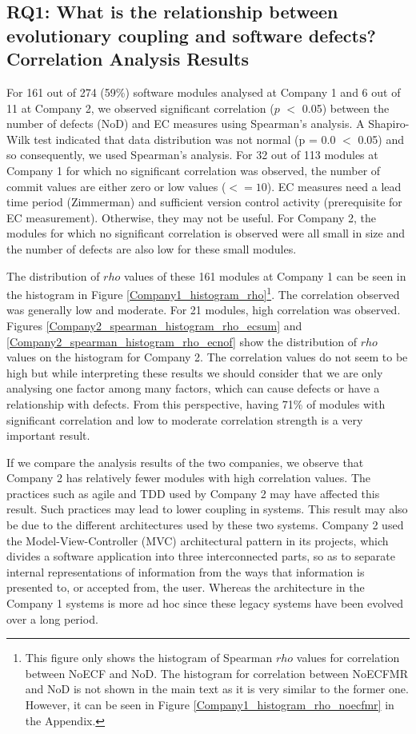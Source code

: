 \documentclass[times]{smrauth}
\begin{document}
\subsection{RQ1: What is the relationship between evolutionary coupling and software defects? Correlation Analysis Results}

For 161 out of 274 (59\%) software modules analysed at Company 1 and 6 out of 11 at Company 2, we observed significant correlation ($p$ $<$ 0.05) between the number of defects (NoD) and EC measures using Spearman's analysis. A Shapiro-Wilk test indicated that data distribution was not normal (p = 0.0 $<$ 0.05) and so consequently, we used Spearman's analysis. For 32 out of 113 modules at Company 1 for which no significant correlation was observed, the number of commit values are either zero or low values ($<=10$). EC measures need a lead time period (Zimmerman) and sufficient version control activity (prerequisite for EC measurement). Otherwise, they may not be useful. For Company 2, the modules for which no significant correlation is observed were all small in size and the number of defects are also low for these small modules.


The distribution of $rho$ values of these 161 modules at Company 1 can be seen in the histogram in Figure \ref{Company1_histogram_rho}\footnote{This figure only shows the histogram of Spearman $rho$ values for correlation between NoECF and NoD. The histogram for correlation between NoECFMR and NoD is not shown in the main text as it is very similar to the former one. However, it can be seen in Figure \ref{Company1_histogram_rho_noecfmr} in the Appendix.}. The correlation observed was generally low and moderate. For 21 modules, high correlation was observed. Figures \ref{Company2_spearman_histogram_rho_ecsum} and \ref{Company2_spearman_histogram_rho_ecnof} show the distribution of $rho$ values on the histogram for Company 2. The correlation values do not seem to be high but while interpreting these results we should consider that we are only analysing one factor among many factors, which can cause defects or have a relationship with defects. From this perspective, having 71\% of modules with significant correlation and low to moderate correlation strength is a very important result.



If we compare the analysis results of the two companies, we observe that Company 2 has relatively fewer modules with high correlation values. The practices such as agile and TDD used by Company 2 may have affected this result. Such practices may lead to lower coupling in systems. This result may also be due to the different architectures used by these two systems. Company 2 used the Model-View-Controller (MVC) architectural pattern in its projects, which divides a software application into three interconnected parts, so as to separate internal representations of information from the ways that information is presented to, or accepted from, the user. Whereas the architecture in the Company 1 systems is more ad hoc since these legacy systems have been evolved over a long period. 
\end{document}
